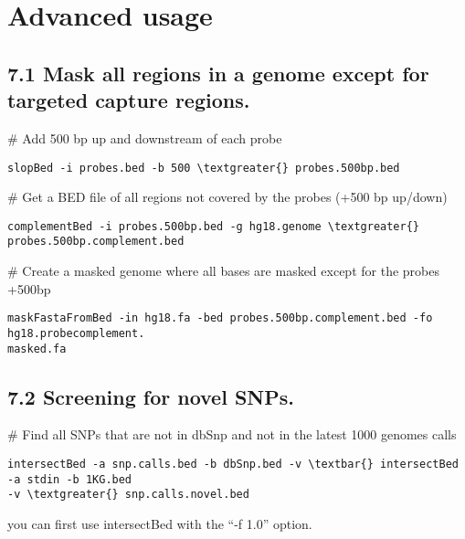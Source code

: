 \documentclass[letterpaper,10pt,english]{sphinxmanual}
\begin{document}
\section{Advanced usage}
\label{content/advanced-usage::doc}\label{content/advanced-usage:advanced-usage}

\subsection{7.1 Mask all regions in a genome except for targeted capture regions.}
\label{content/advanced-usage:mask-all-regions-in-a-genome-except-for-targeted-capture-regions}
\# Add 500 bp up and downstream of each probe

\begin{Verbatim}[commandchars=\\\{\}]
slopBed -i probes.bed -b 500 \textgreater{} probes.500bp.bed
\end{Verbatim}

\# Get a BED file of all regions not covered by the probes (+500 bp up/down)

\begin{Verbatim}[commandchars=\\\{\}]
complementBed -i probes.500bp.bed -g hg18.genome \textgreater{} probes.500bp.complement.bed
\end{Verbatim}

\# Create a masked genome where all bases are masked except for the probes +500bp

\begin{Verbatim}[commandchars=\\\{\}]
maskFastaFromBed -in hg18.fa -bed probes.500bp.complement.bed -fo hg18.probecomplement.
masked.fa
\end{Verbatim}


\subsection{7.2 Screening for novel SNPs.}
\label{content/advanced-usage:screening-for-novel-snps}
\# Find all SNPs that are not in dbSnp and not in the latest 1000 genomes calls

\begin{Verbatim}[commandchars=\\\{\}]
intersectBed -a snp.calls.bed -b dbSnp.bed -v \textbar{} intersectBed -a stdin -b 1KG.bed
-v \textgreater{} snp.calls.novel.bed
\end{Verbatim}

you can first use intersectBed with the ``-f 1.0'' option.
\end{document}
